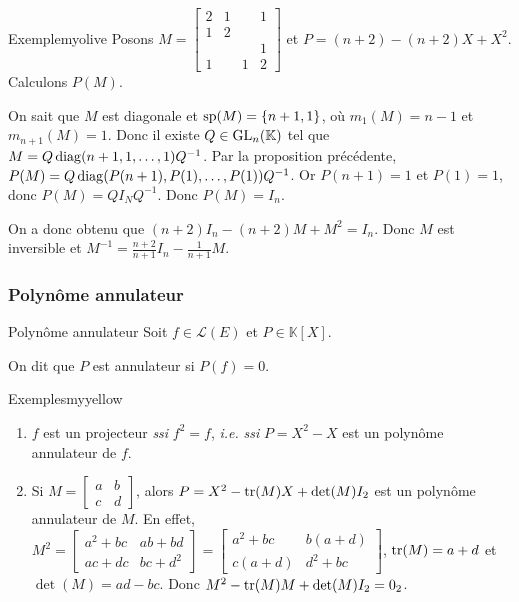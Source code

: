     \begin{omed}{Exemple}{myolive}
        Posons $M = \begin{bmatrix}
            2 & 1 & & 1 \\
            1 & 2 & & \\
            & & & 1 \\
            1 & & 1 &2
        \end{bmatrix}$ et $P = (n+2) - (n+2)X + X^2$. Calculons $P(M)$.

        On sait que $M$ est diagonale et $\sp(M) = \left\{n+1,1\right\}$, où $m_1(M) = n-1$ et $m_{n+1}(M) = 1$. Donc il existe $Q \in \GL_n(\mathbb{K})$ tel que $M = Q \diag(n+1, 1, \ldots, 1) Q^{-1}$. Par la proposition précédente, $P(M) = Q \diag(P(n+1), P(1), \ldots, P(1)) Q^{-1}$. Or $P(n+1) = 1$ et $P(1) = 1$, donc $P(M) = Q I_N Q^{-1}$. Donc $P(M) = I_n$.

        On a donc obtenu que $(n+2) I_n - (n + 2)M + M^2 = I_n$. Donc $M$ est inversible et $M^{-1} = \frac{n+2}{n+1} I_n - \frac{1}{n+1} M$.
    \end{omed}

    \subsubsection{Polynôme annulateur}

    \begin{defi}{Polynôme annulateur}{}
        Soit $f \in \mathcal{L}(E)$ et $P \in \mathbb{K}[X]$.

        On dit que $P$ est annulateur si $P(f) = 0$.
    \end{defi}

    \begin{omed}{Exemples}{myyellow}
        \begin{enumerate}[label=\arabic*.]
            \item $f$ est un projecteur \textit{ssi} $f^2 = f$, \textit{i.e.} \textit{ssi} $P = X^2 - X$ est un polynôme annulateur de $f$.
            \item Si $M = \begin{bmatrix}
                a & b \\
                c & d
            \end{bmatrix}$, alors $P = X^2 - \tr(M) X + \det(M)I_2$ est un polynôme annulateur de $M$. En effet, $M^2 = \begin{bmatrix}
                a^2 + bc & ab + bd \\
                ac + dc & bc + d^2
            \end{bmatrix} = \begin{bmatrix}
                a^2 + bc & b(a+d) \\
                c(a+d) & d^2 + bc
            \end{bmatrix}$, $\tr(M) = a+d$ et $\det(M) = ad - bc$. Donc $M^2 - \tr(M)M + \det(M)I_2 = 0_2$.
        \end{enumerate}
    \end{omed}

